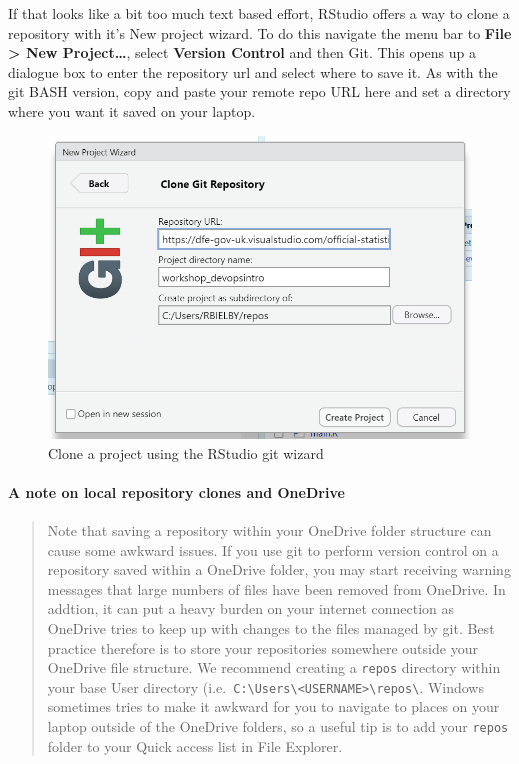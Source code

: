 \documentclass[
  12pt,
]{article}
\begin{document}
If that looks like a bit too much text based effort, RStudio offers a
way to clone a repository with it's New project wizard. To do this
navigate the menu bar to \textbf{File \textgreater{} New
Project\ldots{}}, select \textbf{Version Control} and then Git. This
opens up a dialogue box to enter the repository url and select where to
save it. As with the git BASH version, copy and paste your remote repo
URL here and set a directory where you want it saved on your laptop.

\begin{figure}
\includegraphics[width=0.6\linewidth]{images/DevOpsdemo/DevOps_RStudio_clonerepo} \caption{Clone a project using the RStudio git wizard}\label{fig:unnamed-chunk-6}
\end{figure}

\hypertarget{a-note-on-local-repository-clones-and-onedrive}{%
\paragraph{A note on local repository clones and
OneDrive}\label{a-note-on-local-repository-clones-and-onedrive}}

\begin{quote}
Note that saving a repository within your OneDrive folder structure can
cause some awkward issues. If you use git to perform version control on
a repository saved within a OneDrive folder, you may start receiving
warning messages that large numbers of files have been removed from
OneDrive. In addtion, it can put a heavy burden on your internet
connection as OneDrive tries to keep up with changes to the files
managed by git. Best practice therefore is to store your repositories
somewhere outside your OneDrive file structure. We recommend creating a
\texttt{repos} directory within your base User directory
(i.e.~\texttt{C:\textbackslash{}Users\textbackslash{}\textless{}USERNAME\textgreater{}\textbackslash{}repos\textbackslash{}}.
Windows sometimes tries to make it awkward for you to navigate to places
on your laptop outside of the OneDrive folders, so a useful tip is to
add your \texttt{repos} folder to your Quick access list in File
Explorer.
\end{quote}
\end{document}
